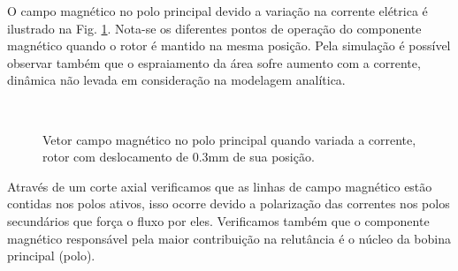 O campo magnético no polo principal  devido a variação na corrente elétrica é ilustrado na Fig. \ref{fig:ativo:fem:b:polos}. Nota-se os diferentes pontos de operação do componente magnético quando o rotor é mantido na mesma posição. Pela simulação é possível observar também que o espraiamento da área sofre aumento com a corrente, dinâmica não levada em consideração na modelagem analítica. 

\begin{figure}[!ht]
	\centering
		\\
	\caption{Vetor campo magnético no polo principal quando variada a corrente, rotor com deslocamento de 0.3mm de sua posição.}
	\label{fig:ativo:fem:b:polos}
\end{figure}

Através de um corte axial verificamos que as linhas de campo magnético estão contidas nos polos ativos, isso ocorre devido a polarização das correntes nos polos secundários que força o fluxo por eles. Verificamos também que o componente magnético responsável pela maior contribuição na relutância é o núcleo da bobina principal (polo).

